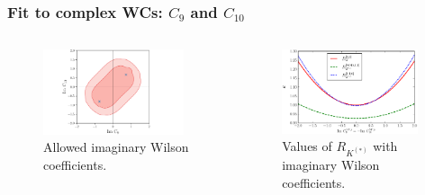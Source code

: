 \documentclass[mathserif, 10pt]{beamer}
\begin{document}
\begin{frame}\frametitle{Fit to complex WCs: $C_9$ and $C_{10}$}
    \begin{columns}
        \begin{column}[t]{0.48\textwidth}
            \begin{figure}
                \centering
                \includegraphics[width=0.95\textwidth]{figures/fitim_C9C10.pdf}\\
                Allowed imaginary Wilson coefficients.
            \end{figure}
        \end{column}
        \begin{column}[t]{0.48\textwidth}
            \begin{figure}
                \centering
                \includegraphics[width=0.95\textwidth]{figures/RK_im.pdf}\\
                Values of $R_{K^{(*)}}$ with imaginary Wilson coefficients.
            \end{figure}
        \end{column}
    \end{columns}


\end{frame}
\end{document}
